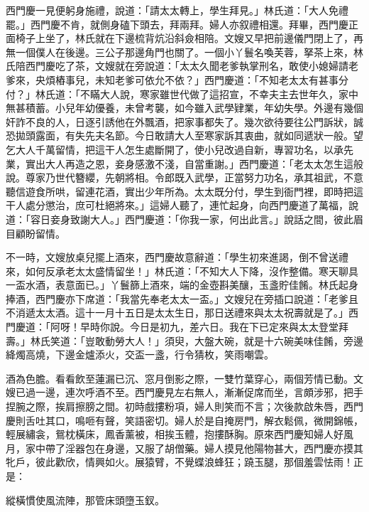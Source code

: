 西門慶一見便躬身施禮，說道：「請太太轉上，學生拜見。」林氏道：「大人免禮罷。」西門慶不肯，就側身磕下頭去，拜兩拜。婦人亦叙禮相還。拜畢，西門慶正面椅子上坐了，林氏就在下邊梳背炕沿斜僉相陪。文嫂又早把前邊儀門閉上了，再無一個僕人在後邊。三公子那邊角門也關了。一個小丫鬟名喚芙蓉，拏茶上來，林氏陪西門慶吃了茶，文嫂就在旁說道：「太太久聞老爹執掌刑名，敢使小媳婦請老爹來，央煩樁事兒，未知老爹可依允不依？」{}西門慶道：「不知老太太有甚事分付？」林氏道：「不瞞大人說，寒家雖世代做了這招宣，不幸夫主去世年久，家中無甚積蓄。小兒年幼優養，未曾考襲，如今雖入武學肄業，年幼失學。外邊有幾個奸詐不良的人，日逐引誘他在外飄酒，把家事都失了。幾次欲待要往公門訴狀，誠恐拋頭露面，有失先夫名節。{}今日敢請大人至寒家訴其衷曲，就如同遞狀一般。望乞大人千萬留情，把這干人怎生處斷開了，使小兒改過自新，專習功名，以承先業，實出大人再造之恩，妾身感激不淺，自當重謝。」西門慶道：「老太太怎生這般說。尊家乃世代簪纓，先朝將相。令郎既入武學，正當努力功名，承其祖武，不意聽信遊食所哄，留連花酒，實出少年所為。太太既分付，學生到衙門裡，即時把這干人處分懲治，庶可杜絕將來。」這婦人聽了，連忙起身，向西門慶道了萬福，說道：「容日妾身致謝大人。」西門慶道：「你我一家，何出此言。」說話之間，彼此眉目顧盼留情。

不一時，文嫂放桌兒擺上酒來，西門慶故意辭道：{}「學生初來進謁，倒不曾送禮來，如何反承老太太盛情留坐！」林氏道：「不知大人下降，沒作整備。寒天聊具一盃水酒，表意面已。」丫鬟篩上酒來，端的金壺斟美釀，玉盞貯佳餚。林氏起身捧酒，西門慶亦下席道：「我當先奉老太太一盃。」文嫂兒在旁插口說道：「老爹且不消遞太太酒。這十一月十五日是太太生日，那日送禮來與太太祝壽就是了。」西門慶道：「阿呀！早時你說。今日是初九，差六日。我在下已定來與太太登堂拜壽。」林氏笑道：「豈敢動勞大人！」須臾，大盤大碗，就是十六碗美味佳餚，旁邊絳燭高燒，下邊金爐添火，交盃一盞，行令猜枚，笑雨嘲雲。

酒為色膽。看看飲至蓮漏已沉、窓月倒影之際，一雙竹葉穿心，兩個芳情已動。文嫂已過一邊，連次呼酒不至。西門慶見左右無人，漸漸促席而坐，言頗涉邪，把手捏腕之際，挨肩擦膀之間。初時戲摟粉項，婦人則笑而不言；次後款啟朱唇，西門慶則舌吐其口，鳴咂有聲，笑語密切。{}婦人於是自掩房門，解衣鬆佩，微開錦帳，輕展繡衾，鴛枕橫床，鳳香薰被，相挨玉體，抱摟酥胸。原來西門慶知婦人好風月，家中帶了淫器包在身邊，又服了胡僧藥。婦人摸見他陽物甚大，西門慶亦摸其牝戶，彼此歡欣，情興如火。展猿臂，不覺蝶浪蜂狂；蹺玉腿，那個羞雲怯雨！正是：

\begin{myquote} 
縱橫慣使風流陣，那管床頭墮玉釵。
\end{myquote} 

